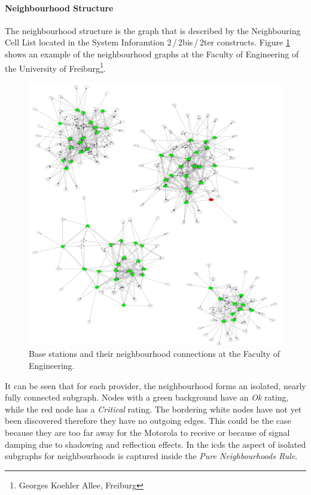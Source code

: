 \paragraph{Neighbourhood Structure}
The neighbourhood structure is the graph that is described by the Neighbouring Cell List located in the System Inforamtion 2\,/\,2bis\,/\,2ter constructs.
Figure \ref{fig:neighbourhood_example} shows an example of the neighbourhood graphs at the Faculty of Engineering of the University of Freiburg\footnote{Georges Koehler Allee, Freiburg}.
\begin{figure}
\centering
\includegraphics[width=.9\textwidth]{../Images/neighbourhoods_fak}
\caption{Base stations and their neighbourhood connections at the Faculty of Engineering.}
\label{fig:neighbourhood_example}
\end{figure}
It can be seen that for each provider, the neighbourhood forms an isolated, nearly fully connected subgraph.
Nodes with a green background have an \emph{Ok} rating, while the red node has a \emph{Critical} rating.
The bordering white nodes have not yet been discovered therefore they have no outgoing edges.
This could be the case because they are too far away for the Motorola to receive or because of signal damping due to shadowing and reflection effects.
In the \gls{icds} the aspect of isolated subgraphs for neighbourhoods is captured inside the \emph{Pure Neighbourhoods Rule}.

